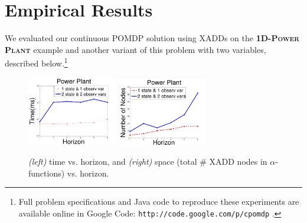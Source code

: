 \documentclass{article} %
\begin{document}
\section{Empirical Results}
We evaluated our continuous POMDP solution using XADDs on the
\textsc{\bf 1D-Power Plant} example and another variant of this
problem with two variables, described below.\footnote{ Full problem
specifications and Java code to reproduce these experiments are available online in
Google Code: \texttt{http://code.google.com/p/cpomdp} .}

\begin{figure}[tbp!]
\vspace{2mm}
\centering
\includegraphics[width=0.35\textwidth]{pics/time3.pdf} \hspace{15mm}
\includegraphics[width=0.35\textwidth]{pics/nodes3.pdf}
\vspace{-1mm}
\caption{\footnotesize 
{\it (left)} time vs. horizon, and 
{\it (right)} space (total \# XADD nodes in $\alpha$-functions) vs. horizon.
}
\label{fig:timeSpace}
\end{figure}
\end{document}

